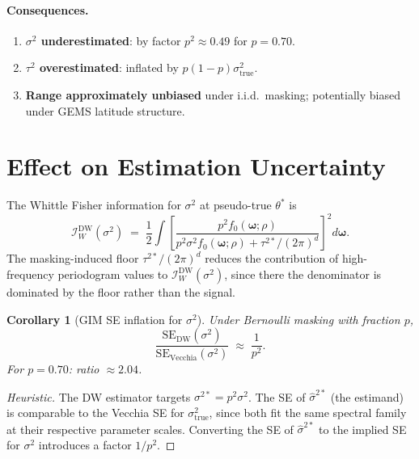 \documentclass[12pt]{article}
\newtheorem{corollary}{Corollary}
\begin{document}
\paragraph{Consequences.}
\begin{enumerate}
  \item \textbf{$\sigma^2$ underestimated}: by factor $p^2 \approx 0.49$
        for $p = 0.70$.
  \item \textbf{$\tau^2$ overestimated}: inflated by $p(1-p)\sigma^2_{\mathrm{true}}$.
  \item \textbf{Range approximately unbiased} under i.i.d.\ masking;
        potentially biased under GEMS latitude structure.
\end{enumerate}


\section{Effect on Estimation Uncertainty}
\label{sec:fisher}

The Whittle Fisher information for $\sigma^2$ at pseudo-true $\theta^*$ is
\[
    \mathcal{I}^{\mathrm{DW}}_W(\sigma^2)
    \;=\; \frac{1}{2}
    \int
    \left[
      \frac{p^2 f_0(\boldsymbol{\omega};\rho)}
           {p^2\sigma^2 f_0(\boldsymbol{\omega};\rho) + \tau^{2*}/(2\pi)^d}
    \right]^2 d\boldsymbol{\omega}.
\]
The masking-induced floor $\tau^{2*}/(2\pi)^d$ reduces the contribution of
high-frequency periodogram values to $\mathcal{I}^{\mathrm{DW}}_W(\sigma^2)$,
since there the denominator is dominated by the floor rather than the
signal.

\begin{corollary}[GIM SE inflation for $\sigma^2$]
\label{cor:se}
Under Bernoulli masking with fraction $p$,
\[
  \frac{\mathrm{SE}_{\mathrm{DW}}(\sigma^2)}
       {\mathrm{SE}_{\mathrm{Vecchia}}(\sigma^2)}
  \;\approx\; \frac{1}{p^2}.
\]
For $p = 0.70$: ratio $\approx 2.04$.
\end{corollary}

\begin{proof}[Heuristic]
The DW estimator targets $\sigma^{2*} = p^2\sigma^2$.
The SE of $\hat\sigma^{2*}$ (the estimand) is comparable to the Vecchia
SE for $\sigma^2_{\mathrm{true}}$, since both fit the same spectral family
at their respective parameter scales.
Converting the SE of $\hat\sigma^{2*}$ to the implied SE for $\sigma^2$
introduces a factor $1/p^2$.
\end{proof}
\end{document}
